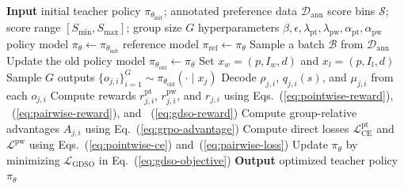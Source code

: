 \documentclass{article}
\newcommand{\teaname}{GDSO\xspace}
\begin{document}
\begin{algorithm}[t]
\caption{Iterative Group-wise Direct Score Optimization (\teaname)}
\label{alg:gdso}
\begin{algorithmic}[1]
  \Statex \textbf{Input} initial teacher policy $\pi_{\theta_{\mathrm{init}}}$; annotated preference data $\mathcal{D}_{\mathrm{ann}}$
  \Statex \hspace{\algorithmicindent} score bins $\mathcal{S}$; score range $[S_{\min},S_{\max}]$; group size $G$
  \Statex \hspace{\algorithmicindent} hyperparameters $\beta,\epsilon,\lambda_{\mathrm{pt}},\lambda_{\mathrm{pw}},\alpha_{\mathrm{pt}},\alpha_{\mathrm{pw}}$
  \State policy model $\pi_\theta \gets \pi_{\theta_{\mathrm{init}}}$
    \State reference model $\pi_{\mathrm{ref}} \gets \pi_\theta$
      \State Sample a batch $\mathcal{B}$ from $\mathcal{D}_{\mathrm{ann}}$
      \State Update the old policy model $\pi_{\theta_{\mathrm{old}}}\gets\pi_\theta$
        \State Set $x_w=(p,I_w,d)$ and $x_l=(p,I_l,d)$
          \State Sample $G$ outputs $\{o_{j,i}\}_{i=1}^{G}\sim\pi_{\theta_{\mathrm{old}}}(\cdot\mid x_j)$
          \State Decode $\rho_{j,i}$, $q_{j,i}(s)$, and $\mu_{j,i}$ from each $o_{j,i}$
        \EndFor
        \State Compute rewards $r^{\mathrm{pt}}_{j,i}$, $r^{\mathrm{pw}}_{j,i}$, and $r_{j,i}$ using Eqs.~(\ref{eq:pointwise-reward}), ~(\ref{eq:pairwise-reward}), and ~(\ref{eq:gdso-reward})
        \State Compute group-relative advantages $A_{j,i}$ using Eq.~(\ref{eq:grpo-advantage})
        \State Compute direct losses $\mathcal{L}^{\mathrm{pt}}_{\mathrm{CE}}$ and $\mathcal{L}^{\mathrm{pw}}$ using Eqs.~(\ref{eq:pointwise-ce}) and~(\ref{eq:pairwise-loss})
      \EndFor
        \State Update $\pi_\theta$ by minimizing $\mathcal{L}_{\mathrm{GDSO}}$ in Eq.~(\ref{eq:gdso-objective})
      \EndFor
    \EndFor
  \EndFor
  \Statex \textbf{Output} optimized teacher policy $\pi_\theta$
\end{algorithmic}
\end{algorithm}
\end{document}
